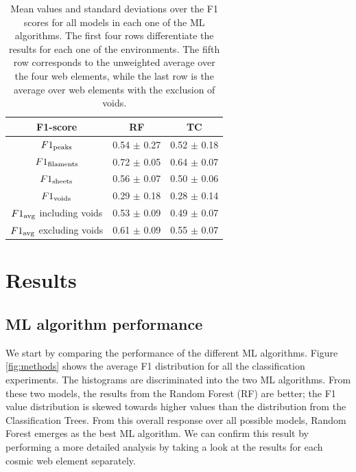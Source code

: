 \documentclass[usenatbib]{mnras}
\begin{document}
\begin{table}
\centering
\begin{tabular}{ccc}
\hline
 F1-score                   & RF              & TC              \\
\hline
 $F1_{\rm peaks}$               & 0.54 $\pm$ 0.27 & 0.52 $\pm$ 0.18 \\
 $F1_{\rm filaments}$           & 0.72 $\pm$ 0.05 & 0.64 $\pm$ 0.07 \\
 $F1_{\rm sheets}$              & 0.56 $\pm$ 0.07 & 0.50 $\pm$ 0.06  \\
 $F1_{\rm voids}$               & 0.29 $\pm$ 0.18 & 0.28 $\pm$ 0.14 \\
 $F1_{\rm avg}$ including voids    & 0.53 $\pm$ 0.09 & 0.49 $\pm$ 0.07 \\
 $F1_{\rm avg}$ excluding voids & 0.61 $\pm$ 0.09 & 0.55 $\pm$ 0.07 \\
\hline
\end{tabular}
\caption{Mean values and standard deviations over the F1
  scores for all models in each one of the ML algorithms.
  The first four rows differentiate the results for each one of the
  environments.
  The fifth row corresponds to the unweighted average over the four
  web elements, while the last row is the average over web elements
  with the exclusion of voids.}
\label{table:elements}
\end{table}


\section{Results}\label{sec:results}

\subsection{ML algorithm performance}


We start by comparing the performance of the different ML algorithms.
Figure \ref{fig:methods} shows the average F1 distribution for
all the classification experiments.
The histograms are discriminated into the two ML algorithms.
From these two models, the results from the Random Forest (RF) are
better; the F1 value distribution is skewed towards higher values than
the distribution from the Classification Trees.
From this overall response over all possible models, Random Forest
emerges as the best ML algorithm.
We can confirm this result by performing a more detailed analysis by
taking a look at the results for each cosmic web element separately.
\end{document}
